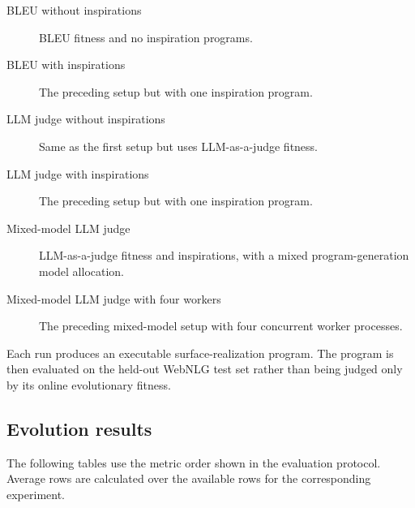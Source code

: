 \begin{description}
    \item[BLEU without inspirations] BLEU fitness and no inspiration programs.
    \item[BLEU with inspirations] The preceding setup
    but with one inspiration program.
    \item[LLM judge without inspirations] Same as the first setup but
    uses LLM-as-a-judge fitness.
    \item[LLM judge with inspirations] The preceding setup
    but with one inspiration program.
    \item[Mixed-model LLM judge] LLM-as-a-judge fitness and inspirations, with
    a mixed program-generation model allocation.
    \item[Mixed-model LLM judge with four workers] The preceding mixed-model
    setup with four concurrent worker processes.
\end{description}

Each run produces an executable surface-realization program. The program is
then evaluated on the held-out WebNLG test set rather than being judged only
by its online evolutionary fitness.

\subsection{Evolution results}

The following tables use the metric order shown in the evaluation protocol.
Average rows are calculated over the available rows for the
corresponding experiment.

\newcommand{\surfaceHeader}{\texttt{domain} & \texttt{BLEU} & \texttt{BLEURT} & \texttt{METEOR} & \texttt{SENLEN} & \texttt{Gemma} & \texttt{Qwen} & \texttt{Themis} & \texttt{gram.} & \texttt{add.} & \texttt{om.} & \texttt{sent.} & \texttt{words} & \texttt{chars} & \texttt{triples} \\\hline}
\newcommand{\surfacerow}[9]{#1 & #2 & #3 & #4 & #5 & #6 & #7 & #8 & #9 & \surfacetail}
\newcommand{\surfacetail}[6]{#1 & #2 & #3 & #4 & #5 & #6 \tabularnewline}
\newcommand{\surfacebaselinerow}[9]{#1 & #2 & #3 & #4 & #5 & #6 & #7 & #8 & #9 & \surfacebaselinetail}
\newcommand{\surfacebaselinetail}[7]{#1 & #2 & #3 & #4 & #5 & #6 & #7 \tabularnewline}
\newcommand{\surfaceInitialHeader}{\texttt{domain} & \texttt{BLEU} & \texttt{BLEURT} & \texttt{METEOR} & \texttt{SENLEN} & \texttt{Gemma} & \texttt{Qwen} & \texttt{Themis} & \texttt{gram.} & \texttt{add.} & \texttt{om.} \\\hline}
\newcommand{\surfaceinitialrow}[9]{#1 & #2 & #3 & #4 & #5 & #6 & #7 & #8 & #9 & \surfaceinitialtail}
\newcommand{\surfaceinitialtail}[6]{#1 & #2 \tabularnewline}

